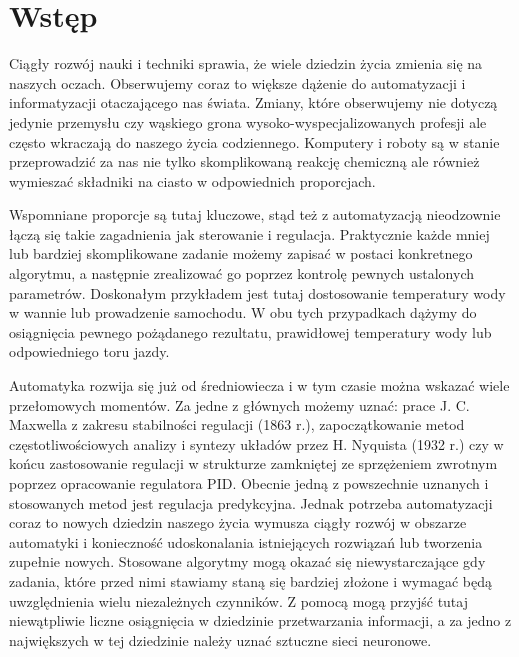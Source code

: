 \newpage %
\section{Wstęp}

\par Ciągły rozwój nauki i techniki sprawia, że wiele dziedzin życia zmienia się na naszych oczach. Obserwujemy coraz to większe dążenie do automatyzacji i informatyzacji otaczającego nas świata. Zmiany, które obserwujemy nie dotyczą jedynie przemysłu czy wąskiego grona wysoko-wyspecjalizowanych profesji ale często wkraczają do naszego życia codziennego. Komputery i roboty są  w stanie przeprowadzić za nas nie tylko skomplikowaną reakcję chemiczną ale również wymieszać składniki na ciasto w odpowiednich proporcjach. 

\par Wspomniane proporcje są tutaj kluczowe, stąd też z automatyzacją nieodzownie łączą się takie zagadnienia jak sterowanie i regulacja. Praktycznie każde mniej lub bardziej skomplikowane zadanie możemy zapisać w postaci konkretnego algorytmu, a następnie zrealizować go poprzez kontrolę pewnych ustalonych parametrów. Doskonałym przykładem jest tutaj dostosowanie temperatury wody w wannie lub prowadzenie samochodu. W obu tych przypadkach dążymy do osiągnięcia pewnego pożądanego rezultatu, prawidłowej temperatury wody lub odpowiedniego toru jazdy.

\par Automatyka rozwija się już od średniowiecza i w tym czasie można wskazać wiele przełomowych momentów. Za jedne z głównych możemy uznać: prace J. C. Maxwella z zakresu stabilności regulacji (1863 r.), zapoczątkowanie metod częstotliwościowych analizy i syntezy układów przez H. Nyquista (1932 r.) czy w końcu zastosowanie regulacji w strukturze zamkniętej ze sprzężeniem zwrotnym poprzez opracowanie regulatora PID. Obecnie jedną z powszechnie uznanych i stosowanych metod jest regulacja predykcyjna. Jednak potrzeba automatyzacji coraz to nowych dziedzin naszego życia wymusza ciągły rozwój w obszarze automatyki i konieczność udoskonalania istniejących rozwiązań lub tworzenia zupełnie nowych. Stosowane algorytmy mogą okazać się niewystarczające gdy zadania, które przed nimi stawiamy staną się bardziej złożone i wymagać będą uwzględnienia wielu niezależnych czynników. Z pomocą mogą przyjść tutaj niewątpliwie liczne osiągnięcia w dziedzinie przetwarzania informacji, a za jedno z największych w tej dziedzinie należy uznać sztuczne sieci neuronowe.

